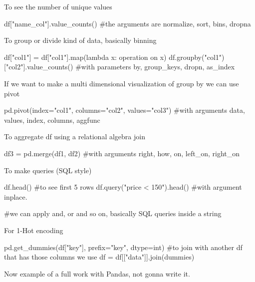 To see the number of unique values

\begin{pythoncode}
    df["name_col"].value_counts() #the arguments are normalize, sort, bins, dropna
\end{pythoncode}

To group or divide kind of data, basically binning

\begin{pythoncode}
    df["col1"] = df["col1"].map(lambda x: operation on x)
    df.groupby("col1") ["col2"].value_counts() #with parameters by, group_keys, dropn, as_index
\end{pythoncode}

If we want to make a multi dimensional visualization of group by we can use pivot

\begin{pythoncode}
    

pd.pivot(index="col1", columns="col2", values="col3") #with arguments data, values, index, columns, aggfunc

\end{pythoncode}

To aggregate df using a relational algebra join

\begin{pythoncode}
    df3 = pd.merge(df1, df2) #with arguments right, how, on, left_on, right_on
\end{pythoncode}

To make queries (SQL style)

\begin{pythoncode}
    df.head() #to see first 5 rows
    df.query("price < 150").head() #with argument inplace. 

    #we can apply and, or and so on, basically SQL queries inside a string
\end{pythoncode}

For 1-Hot encoding

\begin{pythoncode}
    pd.get_dummies(df["key"], prefix="key", dtype=int) #to join with another df that has those columns we use
    df = df[["data"]].join(dummies)
\end{pythoncode}

Now example of a full work with Pandas, not gonna write it.
